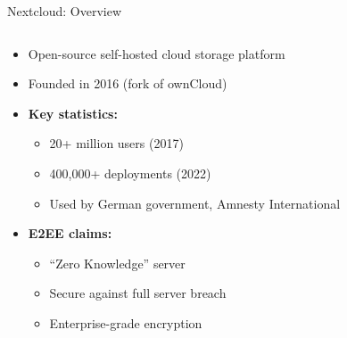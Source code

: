 \documentclass[aspectratio=169, lualatex, handout]{beamer}
\begin{document}
\begin{frame}{Nextcloud: Overview}
	\begin{columns}[c]
		\begin{column}{0.75\textwidth}
			\begin{itemize}
				\item Open-source self-hosted cloud storage platform
				\item Founded in 2016 (fork of ownCloud)
				\item \textbf{Key statistics:}
				      \begin{itemize}
					      \item 20+ million users (2017)
					      \item 400,000+ deployments (2022)
					      \item Used by German government, Amnesty International
				      \end{itemize}
				\item \textbf{E2EE claims:}
				      \begin{itemize}
					      \item ``Zero Knowledge'' server
					      \item Secure against full server breach
					      \item Enterprise-grade encryption
				      \end{itemize}
			\end{itemize}
		\end{column}
		\begin{column}{0.25\textwidth}
		\end{column}
	\end{columns}
\end{frame}
\end{document}
